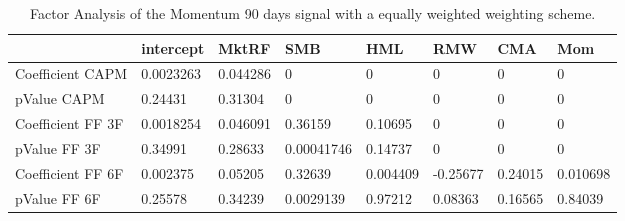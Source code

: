 \begin{table}[H]
\centering
\begin{tabular}{llllllll}
& intercept & MktRF & SMB & HML & RMW & CMA & Mom \\ 
\hline 
Coefficient CAPM & 0.0023263 & 0.044286 & 0 & 0 & 0 & 0 & 0 \\ 
pValue CAPM & 0.24431 & 0.31304 & 0 & 0 & 0 & 0 & 0 \\ 
Coefficient FF 3F & 0.0018254 & 0.046091 & 0.36159 & 0.10695 & 0 & 0 & 0 \\ 
pValue FF 3F & 0.34991 & 0.28633 & 0.00041746 & 0.14737 & 0 & 0 & 0 \\ 
Coefficient FF 6F & 0.002375 & 0.05205 & 0.32639 & 0.004409 & -0.25677 & 0.24015 & 0.010698 \\ 
pValue FF 6F & 0.25578 & 0.34239 & 0.0029139 & 0.97212 & 0.08363 & 0.16565 & 0.84039 \\ 
\hline
\end{tabular}
\caption{Factor Analysis of the Momentum 90 days signal with a equally weighted weighting scheme.}
\label{MOM90EW_FACTOR}
\end{table}
